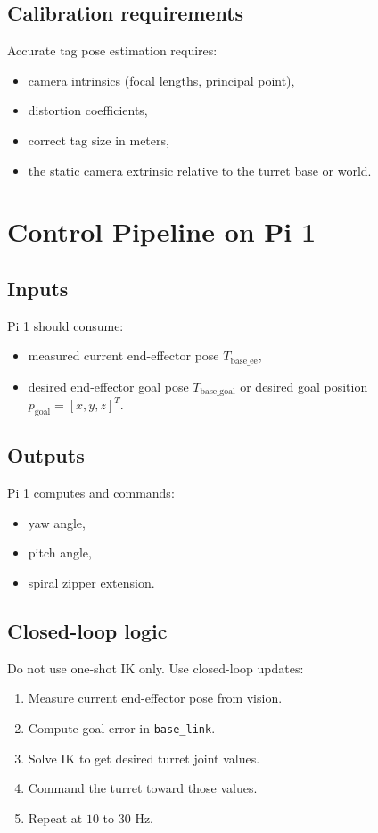 \documentclass[11pt]{article}
\begin{document}
\subsection*{Calibration requirements}
Accurate tag pose estimation requires:
\begin{itemize}[leftmargin=1.5em]
  \item camera intrinsics (focal lengths, principal point),
  \item distortion coefficients,
  \item correct tag size in meters,
  \item the static camera extrinsic relative to the turret base or world.
\end{itemize}

\section*{Control Pipeline on Pi 1}
\subsection*{Inputs}
Pi 1 should consume:
\begin{itemize}[leftmargin=1.5em]
  \item measured current end-effector pose \(T_{\text{base}\_\text{ee}}\),
  \item desired end-effector goal pose \(T_{\text{base}\_\text{goal}}\) or desired goal position \(p_{\text{goal}} = [x, y, z]^T\).
\end{itemize}

\subsection*{Outputs}
Pi 1 computes and commands:
\begin{itemize}[leftmargin=1.5em]
  \item yaw angle,
  \item pitch angle,
  \item spiral zipper extension.
\end{itemize}

\subsection*{Closed-loop logic}
Do not use one-shot IK only. Use closed-loop updates:
\begin{enumerate}[leftmargin=1.7em]
  \item Measure current end-effector pose from vision.
  \item Compute goal error in \texttt{base\_link}.
  \item Solve IK to get desired turret joint values.
  \item Command the turret toward those values.
  \item Repeat at \(10\) to \(30\) Hz.
\end{enumerate}
\end{document}
